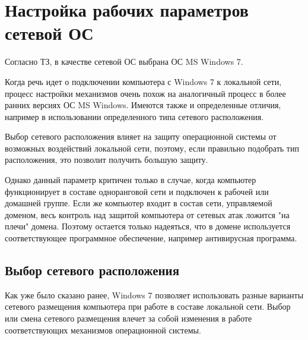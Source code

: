 \newpage

\section{Настройка рабочих параметров сетевой ОС}

Согласно ТЗ, в качестве сетевой ОС выбрана ОС MS Windows 7.\par\bigskip

Когда речь идет о подключении компьютера с Windows 7 к локальной сети, процесс настройки механизмов очень похож на аналогичный процесс в более ранних версиях ОС MS Windows. Имеются также и определенные отличия, например в использовании определенного типа сетевого расположения.\par\bigskip

Выбор сетевого расположения влияет на защиту операционной системы от возможных воздействий локальной сети, поэтому, если правильно подобрать тип расположения, это позволит получить большую защиту.\par\bigskip

Однако данный параметр критичен только в случае, когда компьютер функционирует в составе одноранговой сети и подключен к рабочей или домашней группе. Если же компьютер входит в состав сети, управляемой доменом, весь контроль над защитой компьютера от сетевых атак ложится "на плечи" домена. Поэтому остается только надеяться, что в домене используется соответствующее программное обеспечение, например антивирусная программа.\par\bigskip

\subsection{Выбор сетевого расположения}

Как уже было сказано ранее, Windows 7 позволяет использовать разные варианты сетевого размещения компьютера при работе в составе локальной сети. Выбор или смена сетевого размещения влечет за собой изменения в работе соответствующих механизмов операционной системы.\par\bigskip

